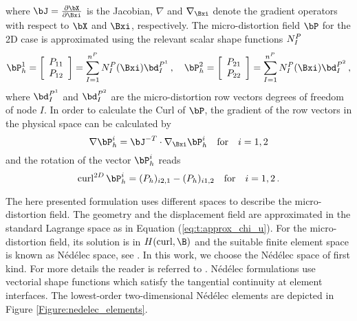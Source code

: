where $\bJ = \frac{\partial \bX}{\partial \Bxi  }$ is the Jacobian, $\nabla$  and $\nabla_\Bxi $ denote the gradient operators with respect to $\bX$ and $\Bxi$, respectively.  
The micro-distortion field $\Bdis$ for the 2D case is approximated using the relevant scalar shape functions $N^P_I$  
\begin{equation}
\Bdis_h^1 =  \left[ \begin{array}{c}
\dis_{11} \\
\dis_{12} \\
\end{array} \right] =   \sum_{I=1}^{n^\dis}   N^\dis_I(\Bxi) \bd^{\dis^1}_I\,, \quad
\Bdis_h^2 =  \left[ \begin{array}{c}
\dis_{21} \\
\dis_{22} \\
\end{array} \right] =   \sum_{I=1}^{n^\dis}   N^\dis_I(\Bxi) \bd^{\dis^2}_I\,,
\end{equation}
where  $\bd^{\dis^1}_I$ and $\bd^{\dis^2}_I$ are the micro-distortion row vectors degrees of freedom of node $I$. In order to calculate the Curl of  $\Bdis$, the gradient of the row vectors in the physical space can be calculated by
\begin{equation}
\nabla \Bdis_h^{i} = \bJ^{-T} \cdot \nabla_\Bxi \Bdis_h^{i} \quad \textrm{for} \quad i=1,2 
\end{equation}
and the rotation of the vector $\Bdis_h^{i}$ reads 
\begin{equation}
\curl^{2D}{\Bdis_h^{i}} = (\dis_h)_{i2,1} - (\dis_h)_{i1,2} \quad \textrm{for} \quad i=1,2 \,.
\end{equation}

\label{sec:mixelements}
The here presented formulation uses different spaces to describe the micro-distortion field. The geometry and the displacement field are approximated in the standard Lagrange space as in Equation (\ref{eq:t:approx_chi_u}).  For the micro-distortion field, its solution is in $ H(\curl,\B)$ and the suitable finite element space is known as N\'ed\'elec space, see \cite{Ned:1980:mfe,Ned:1986:anf}. In this work, we choose the N\'ed\'elec space of  first kind. For more details the reader is referred to  \cite{KirLogRogTer:2012:cau,RogKirAnd:2009:eao,BofBreFor:2014:mfe,Mon:1993:ano}. N\'ed\'elec formulations use vectorial shape functions which satisfy the tangential continuity at element interfaces. The lowest-order two-dimensional N\'ed\'elec elements are depicted in Figure  \ref{Figure:nedelec_elements}. 


